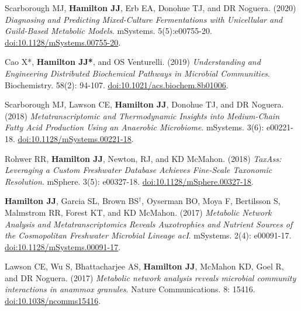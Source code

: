 \documentclass[letterpaper,10pt]{article}
\begin{document}
\begin{etaremune}[itemsep=-2pt]
	\item Scarborough MJ, \textbf{Hamilton JJ}, Erb EA, Donohue TJ, and DR Noguera. (2020) \emph{Diagnosing and Predicting Mixed-Culture Fermentations with Unicellular and Guild-Based Metabolic Models}. mSystems. 5(5):e00755-20. \href{https://doi.org/10.1128/mSystems.00755-20}{doi:10.1128/mSystems.00755-20}.
	\item Cao X*, \textbf{Hamilton JJ*}, and OS Venturelli. (2019) \emph{Understanding and Engineering Distributed Biochemical Pathways in Microbial Communities}. Biochemistry. 58(2): 94-107. \href{https://doi.org/10.1021/acs.biochem.8b01006}{doi:10.1021/acs.biochem.8b01006}.
	\item Scarborough MJ, Lawson CE, \textbf{Hamilton JJ}, Donohue TJ, and DR Noguera. (2018) \emph{Metatranscriptomic and Thermodynamic Insights into Medium-Chain Fatty Acid Production Using an Anaerobic Microbiome}. mSystems. 3(6): e00221-18. \href{https://doi.org/10.1128/mSystems.00221-18}{doi:10.1128/mSystems.00221-18}.
	\item Rohwer RR, \textbf{Hamilton JJ}, Newton, RJ, and KD McMahon. (2018) \emph{TaxAss: Leveraging a Custom Freshwater Database Achieves Fine-Scale Taxonomic Resolution}. mSphere. 3(5): e00327-18. \href{https://doi.org/10.1128/mSphere.00327-18}{doi:10.1128/mSphere.00327-18}.
	\item \textbf{Hamilton JJ}, Garcia SL, Brown BS$^\dagger$, Oyserman BO, Moya F, Bertilsson S, Malmstrom RR, Forest KT, and KD McMahon. (2017) \emph{Metabolic Network Analysis and Metatranscriptomics Reveals Auxotrophies and Nutrient Sources of the Cosmopolitan Freshwater Microbial Lineage acI}. mSystems. 2(4): e00091-17. \href{https://doi.org/10.1128/mSystems.00091-17}{doi:10.1128/mSystems.00091-17}.
	\item Lawson CE, Wu S, Bhattacharjee AS, \textbf{Hamilton JJ}, McMahon KD, Goel R, and DR Noguera. (2017) \emph{Metabolic network analysis reveals microbial community interactions in anammox granules}. Nature Communications. 8: 15416. \href{https://www.nature.com/articles/ncomms15416}{doi:10.1038/ncomms15416}.

\end{etaremune}
\end{document}

